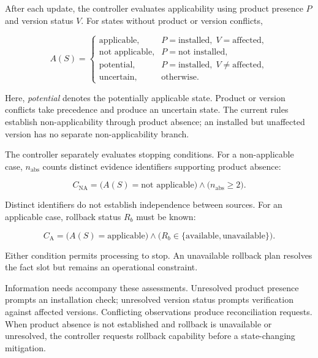 \documentclass[conference]{IEEEtran}
\begin{document}
After each update, the controller evaluates applicability using
product presence $P$ and version status $V$. For states without
product or version conflicts,

\begin{equation}
A(S)=
\begin{cases}
\text{applicable}, &
P=\text{installed},\; V=\text{affected},\\
\text{not applicable}, &
P=\text{not installed},\\
\text{potential}, &
P=\text{installed},\; V\neq\text{affected},\\
\text{uncertain}, &
\text{otherwise}.
\end{cases}
\label{eq:applicability}
\end{equation}

Here, \textit{potential} denotes the potentially applicable state.
Product or version conflicts take precedence and produce an uncertain
state. The current rules establish non-applicability through product
absence; an installed but unaffected version has no separate
non-applicability branch.

The controller separately evaluates stopping conditions. For a
non-applicable case, $n_{\mathrm{abs}}$ counts distinct evidence
identifiers supporting product absence:

\begin{equation}
C_{\mathrm{NA}}
=
\bigl(A(S)=\text{not applicable}\bigr)
\land
\bigl(n_{\mathrm{abs}}\geq 2\bigr).
\label{eq:na_sufficient}
\end{equation}

Distinct identifiers do not establish independence between sources.
For an applicable case, rollback status $R_b$ must be known:

\begin{equation}
C_{\mathrm{A}}
=
\bigl(A(S)=\text{applicable}\bigr)
\land
\bigl(R_b\in\{\text{available},\text{unavailable}\}\bigr).
\label{eq:a_sufficient}
\end{equation}

Either condition permits processing to stop. An unavailable rollback
plan resolves the fact slot but remains an operational constraint.

Information needs accompany these assessments. Unresolved product
presence prompts an installation check; unresolved version status
prompts verification against affected versions. Conflicting observations
produce reconciliation requests. When product absence is not established
and rollback is unavailable or unresolved, the controller requests
rollback capability before a state-changing mitigation.
\end{document}
